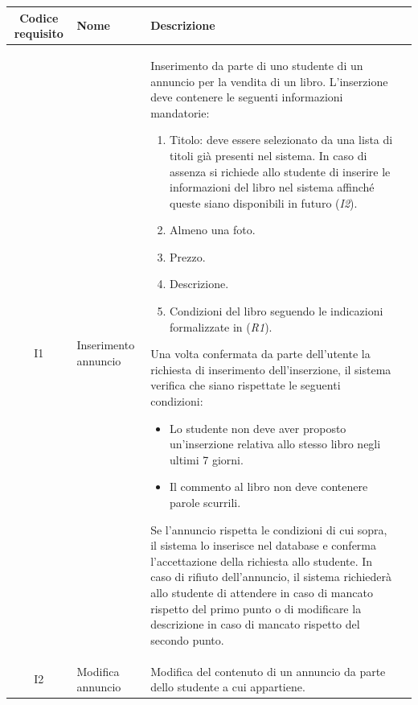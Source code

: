 \documentclass[10pt,a4paper]{article}
\begin{document}
	\begin{tabular}{cp{3cm}p{9cm}p{1cm}}
		Codice requisito&Nome&Descrizione\\ \hline
		I1&Inserimento annuncio&Inserimento da parte di uno studente di un annuncio per la vendita di un libro. L'inserzione deve contenere le seguenti informazioni mandatorie:
		\begin{enumerate}
			\item Titolo: deve essere selezionato da una lista di titoli già presenti nel sistema. In caso di assenza si richiede allo studente di inserire le informazioni del libro nel sistema affinché queste siano disponibili in futuro (\textit{I2}).
			\item Almeno una foto.
			\item Prezzo.
			\item Descrizione.	
			\item Condizioni del libro seguendo le indicazioni formalizzate in (\textit{R1}).
		\end{enumerate}
		Una volta confermata da parte dell'utente la richiesta di inserimento dell'inserzione, il sistema verifica che siano rispettate le seguenti condizioni:
		\begin{itemize}
			\item Lo studente non deve aver proposto un'inserzione relativa allo stesso libro negli ultimi 7 giorni.
			\item Il commento al libro non deve contenere parole scurrili.
		\end{itemize}
		Se l'annuncio rispetta le condizioni di cui sopra, il sistema lo inserisce nel database e conferma l'accettazione della richiesta allo studente. In caso di rifiuto dell'annuncio, il sistema richiederà allo studente di attendere in caso di mancato rispetto del primo punto o di modificare la descrizione in caso di mancato rispetto del secondo punto.\\ \hline
		I2&Modifica annuncio&Modifica del contenuto di un annuncio da parte dello studente a cui appartiene.\\ \hline
	\end{tabular}
	\newpage
\end{document}
